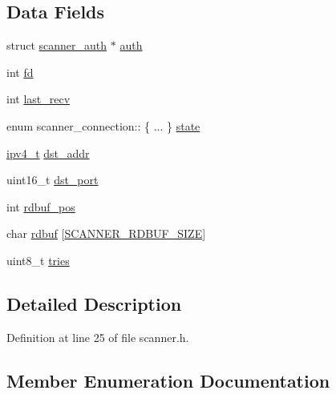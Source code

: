 \subsection*{Data Fields}
\begin{DoxyCompactItemize}
\item 
struct \hyperlink{structscanner__auth}{scanner\+\_\+auth} $\ast$ \hyperlink{structscanner__connection_ae0f73c6a5c3e1a1ce22822fc88610bff}{auth}
\item 
int \hyperlink{structscanner__connection_a6f8059414f0228f0256115e024eeed4b}{fd}
\item 
int \hyperlink{structscanner__connection_ad127e56d0e8e42d9e183c7779015c25a}{last\+\_\+recv}
\item 
enum scanner\+\_\+connection\+:: \{ ... \}  \hyperlink{structscanner__connection_a139c1a21e3b186670166bd86fd15bbf6}{state}
\item 
\hyperlink{loader_2src_2headers_2includes_8h_aaadf2e480fd246ff9e932039b223baed}{ipv4\+\_\+t} \hyperlink{structscanner__connection_a2d22095a6311539df835109315b37ffe}{dst\+\_\+addr}
\item 
uint16\+\_\+t \hyperlink{structscanner__connection_ae18defed4756b8c15e34718f51e86e55}{dst\+\_\+port}
\item 
int \hyperlink{structscanner__connection_abd4c86054fbe97fb3b12d233da01798d}{rdbuf\+\_\+pos}
\item 
char \hyperlink{structscanner__connection_ab80770ee6fdc6ba2112df048b1d555f2}{rdbuf} \mbox{[}\hyperlink{scanner_8h_a001f7782e8f74809d4ccfa093bc7e01f}{S\+C\+A\+N\+N\+E\+R\+\_\+\+R\+D\+B\+U\+F\+\_\+\+S\+I\+ZE}\mbox{]}
\item 
uint8\+\_\+t \hyperlink{structscanner__connection_a5522305c1de4f07a6c6feb7275863f8f}{tries}
\end{DoxyCompactItemize}


\subsection{Detailed Description}


Definition at line 25 of file scanner.\+h.



\subsection{Member Enumeration Documentation}
